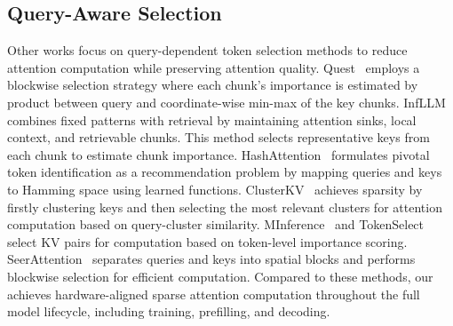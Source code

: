 \subsection{Query-Aware Selection}
Other works focus on query-dependent token selection methods to reduce attention computation while preserving attention quality.
Quest~\citep{quest} employs a blockwise selection strategy where each chunk's importance is estimated by product between query and coordinate-wise min-max of the key chunks.
InfLLM~\citep{infllm} combines fixed patterns with retrieval by maintaining attention sinks, local context, and retrievable chunks. This method selects representative keys from each chunk to estimate chunk importance.
HashAttention~\citep{desai2024hashattention} formulates pivotal token identification as a recommendation problem by mapping queries and keys to Hamming space using learned functions.
ClusterKV~\citep{clusterkv} achieves sparsity by firstly clustering keys and then selecting the most relevant clusters for attention computation based on query-cluster similarity.
MInference~\citep{minference} and TokenSelect~\citep{wu2024tokenselect} select KV pairs for computation based on token-level importance scoring.
SeerAttention~\citep{gao2024seerattention} separates queries and keys into spatial blocks and performs blockwise selection for efficient computation.
Compared to these methods, our \method{} achieves hardware-aligned sparse attention computation throughout the full model lifecycle, including training, prefilling, and decoding.